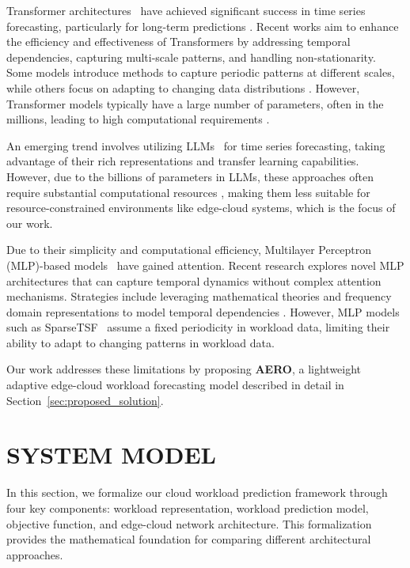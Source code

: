 \documentclass{ieeetmlcn}
\begin{document}
Transformer architectures~\cite{wu2023timesnettemporal2dvariationmodeling} have achieved significant success in time series forecasting, particularly for long-term predictions \cite{vaswani2017attention}. Recent works aim to enhance the efficiency and effectiveness of Transformers by addressing temporal dependencies, capturing multi-scale patterns, and handling non-stationarity. Some models introduce methods to capture periodic patterns at different scales, while others focus on adapting to changing data distributions \cite{jia2024witran}. However, Transformer models typically have a large number of parameters, often in the millions, leading to high computational requirements \cite{liu2023nonstationary}.

An emerging trend involves utilizing LLMs~\cite{tang2023one, liu2023large} for time series forecasting, taking advantage of their rich representations and transfer learning capabilities. However, due to the billions of parameters in LLMs, these approaches often require substantial computational resources \cite{rasul2023forecasting}, making them less suitable for resource-constrained environments like edge-cloud systems, which is the focus of our work.\textbf{}

Due to their simplicity and computational efficiency, Multilayer Perceptron (MLP)-based models~\cite{zeng2023koopa, wu2023timemlp, liu2023fits} have gained attention. Recent research explores novel MLP architectures that can capture temporal dynamics without complex attention mechanisms. Strategies include leveraging mathematical theories and frequency domain representations to model temporal dependencies \cite{zhou2023patchTST}. However, MLP models such as SparseTSF~\cite{sparseTSF} assume a fixed periodicity in workload data, limiting their ability to adapt to changing patterns in workload data.

Our work addresses these limitations by proposing \textbf{AERO}, a lightweight adaptive edge-cloud workload forecasting model described in detail in Section~\ref{sec:proposed_solution}.

\section{SYSTEM MODEL}
\label{sec:system_model}

In this section, we formalize our cloud workload prediction framework through four key components: workload representation, workload prediction model, objective function, and edge-cloud network architecture. This formalization provides the mathematical foundation for comparing different architectural approaches.
\end{document}
